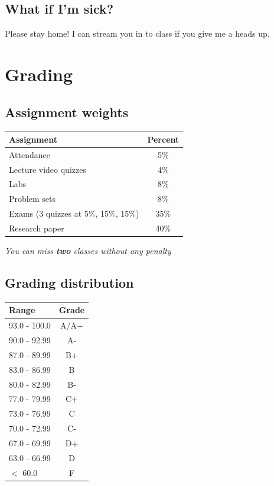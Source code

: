 \documentclass[11pt]{article}
\begin{document}
\hypertarget{what-if-im-sick}{%
\subsection{What if I'm sick?}\label{what-if-im-sick}}

Please stay home! I can stream you in to class if you give me a heads
up.

\hypertarget{grading}{%
\section*{Grading}\label{grading}}

\hypertarget{assignment-weights}{%
\subsection*{Assignment weights}\label{assignment-weights}}

\begin{longtable}[]{@{}lc@{}}
\toprule
Assignment & Percent \\
\midrule
\endhead
Attendance & 5\% \\
Lecture video quizzes & 4\% \\
Labs & 8\% \\
Problem sets & 8\% \\
Exams (3 quizzes at 5\%, 15\%, 15\%) & 35\% \\
Research paper & 40\% \\
\bottomrule
\end{longtable}

\emph{You can miss \textbf{two} classes without any penalty}

\hypertarget{grading-distribution}{%
\subsection*{Grading distribution}\label{grading-distribution}}

\begin{longtable}[]{@{}lc@{}}
\toprule
Range & Grade \\
\midrule
\endhead
93.0 - 100.0 & A/A+ \\
90.0 - 92.99 & A- \\
87.0 - 89.99 & B+ \\
83.0 - 86.99 & B \\
80.0 - 82.99 & B- \\
77.0 - 79.99 & C+ \\
73.0 - 76.99 & C \\
70.0 - 72.99 & C- \\
67.0 - 69.99 & D+ \\
63.0 - 66.99 & D \\
\(<\) 60.0 & F \\
\bottomrule
\end{longtable}
\end{document}
